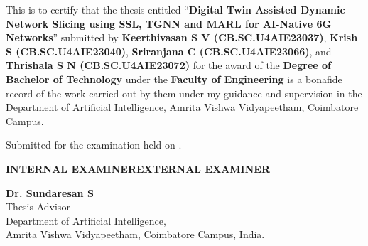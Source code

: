 \documentclass[a4paper, 12pt]{report}
\theoremstyle{definition}
\begin{document}
	\vspace*{.9cm}
	\noindent\begin{minipage}{\textwidth}
	\normalsize{}
	\noindent This is to certify that the thesis entitled \enquote{\textbf{Digital Twin Assisted Dynamic Network Slicing using SSL, TGNN and MARL for AI-Native 6G Networks}} submitted by \textbf{Keerthivasan S V (CB.SC.U4AIE23037)}, \textbf{Krish S (CB.SC.U4AIE23040)}, \textbf{Sriranjana C (CB.SC.U4AIE23066)}, and \textbf{Thrishala S N (CB.SC.U4AIE23072)} for the award of the \textbf{Degree of Bachelor of Technology} under the \textbf{Faculty of Engineering} is a bonafide record of the work carried out by them under my guidance and supervision in the Department of Artificial Intelligence, Amrita Vishwa Vidyapeetham, Coimbatore Campus.
	\end{minipage}
	\vspace*{3.5cm}

	\noindent Submitted for the examination held on \underline{\hspace{3.6cm}}.

	\vspace*{1cm}
	\noindent\textbf{INTERNAL EXAMINER}\hfill\textbf{EXTERNAL EXAMINER}
	\vspace*{3.2cm}

	\begin{center}
		\textbf{Dr. Sundaresan S}\\
		Thesis Advisor\\
		Department of Artificial Intelligence,\\
		Amrita Vishwa Vidyapeetham, Coimbatore Campus, India.
	\end{center}
\end{document}
